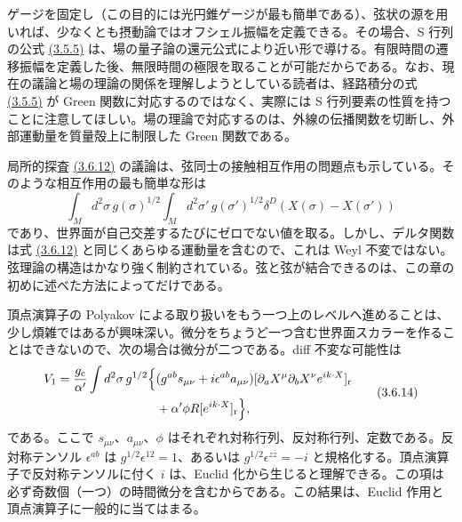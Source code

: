 ゲージを固定し（この目的には光円錐ゲージが最も簡単である）、弦状の源を用いれば、少なくとも摂動論ではオフシェル振幅を定義できる。その場合、S 行列の公式 \hyperref[eq:3.5.5]{(3.5.5)} は、場の量子論の還元公式により近い形で導ける。有限時間の遷移振幅を定義した後、無限時間の極限を取ることが可能だからである。なお、現在の議論と場の理論の関係を理解しようとしている読者は、経路積分の式 \hyperref[eq:3.5.5]{(3.5.5)} が Green 関数に対応するのではなく、実際には S 行列要素の性質を持つことに注意してほしい。場の理論で対応するのは、外線の伝播関数を切断し、外部運動量を質量殻上に制限した Green 関数である。

局所的探査 \hyperref[eq:3.6.12]{(3.6.12)} の議論は、弦同士の接触相互作用の問題点も示している。そのような相互作用の最も簡単な形は
\begin{equation}
\int_M d^2\sigma\,g(\sigma)^{1/2}
\int_M d^2\sigma'\,g(\sigma')^{1/2}
\delta^D(X(\sigma)-X(\sigma'))
\tag{3.6.13}\label{eq:3.6.13}
\end{equation}
であり、世界面が自己交差するたびにゼロでない値を取る。しかし、デルタ関数は式 \hyperref[eq:3.6.12]{(3.6.12)} と同じくあらゆる運動量を含むので、これは Weyl 不変ではない。弦理論の構造はかなり強く制約されている。弦と弦が結合できるのは、この章の初めに述べた方法によってだけである。


頂点演算子の Polyakov による取り扱いをもう一つ上のレベルへ進めることは、少し煩雑ではあるが興味深い。微分をちょうど一つ含む世界面スカラーを作ることはできないので、次の場合は微分が二つである。diff 不変な可能性は
\begin{equation}
\begin{aligned}
V_1=\frac{g_{\mathrm c}}{\alpha'}\int d^2\sigma\,g^{1/2}
\Bigl\{&(g^{ab}s_{\mu\nu}+i\epsilon^{ab}a_{\mu\nu})
[\partial_aX^\mu\partial_bX^\nu e^{ik\cdot X}]_{\mathrm r}\\
&+\alpha'\phi R[e^{ik\cdot X}]_{\mathrm r}\Bigr\},
\end{aligned}
\tag{3.6.14}\label{eq:3.6.14}
\end{equation}
である。ここで $s_{\mu\nu}$、$a_{\mu\nu}$、$\phi$ はそれぞれ対称行列、反対称行列、定数である。反対称テンソル $\epsilon^{ab}$ は $g^{1/2}\epsilon^{12}=1$、あるいは $g^{1/2}\epsilon^{z\bar z}=-i$ と規格化する。頂点演算子で反対称テンソルに付く $i$ は、Euclid 化から生じると理解できる。この項は必ず奇数個（一つ）の時間微分を含むからである。この結果は、Euclid 作用と頂点演算子に一般的に当てはまる。

